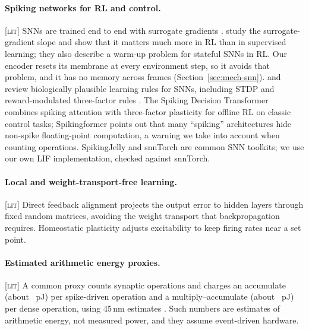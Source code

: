 \documentclass[10pt]{article}
\newcommand{\lit}{\textsc{[lit]}\xspace}
\begin{document}
\paragraph{Spiking networks for RL and control.} \lit SNNs are trained end to end with surrogate gradients
\citep{neftci2019surrogate}. \citet{vandenberghe2025adaptive} study the surrogate-gradient slope and show that it
matters much more in RL than in supervised learning; they also describe a warm-up problem for stateful SNNs in RL.
Our encoder resets its membrane at every environment step, so it avoids that problem, and it has no memory across
frames (Section~\ref{sec:mech-snn}). \citet{lee2025brain} and \citet{huo2025research} review biologically plausible
learning rules for SNNs, including STDP and reward-modulated three-factor rules \citep{bi1998synaptic,
fremaux2016neuromodulated}. The Spiking Decision Transformer \citep{pandey2025spiking} combines spiking attention with
three-factor plasticity for offline RL on classic control tasks; Spikingformer \citep{zhou2026spikingformer}
points out that many ``spiking'' architectures hide non-spike floating-point computation, a warning we take into
account when counting operations. SpikingJelly \citep{fang2023spikingjelly} and snnTorch \citep{eshraghian2023training}
are common SNN toolkits; we use our own LIF implementation, checked against snnTorch.

\paragraph{Local and weight-transport-free learning.} \lit Direct feedback alignment \citep{nokland2016direct}
projects the output error to hidden layers through fixed random matrices, avoiding the weight transport that
backpropagation requires. Homeostatic plasticity \citep{turrigiano2004homeostatic} adjusts excitability to keep
firing rates near a set point.

\paragraph{Estimated arithmetic energy proxies.} \lit A common proxy counts synaptic operations and charges an
accumulate (about \pjAc~pJ) per spike-driven operation and a multiply--accumulate (about \pjMac~pJ) per dense
operation, using 45\,nm estimates \citep{horowitz2014computing}. Such numbers are estimates of arithmetic energy, not
measured power, and they assume event-driven hardware.

\end{document}
